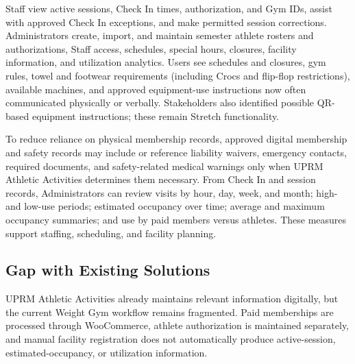 \documentclass[11pt,letterpaper]{article}
\begin{document}
Staff view active sessions, Check In times, authorization, and Gym IDs, assist with approved Check In exceptions, and make permitted session corrections. Administrators create, import, and maintain semester athlete rosters and authorizations, Staff access, schedules, special hours, closures, facility information, and utilization analytics. Users see schedules and closures, gym rules, towel and footwear requirements (including Crocs and flip-flop restrictions), available machines, and approved equipment-use instructions now often communicated physically or verbally. Stakeholders also identified possible QR-based equipment instructions; these remain Stretch functionality.

To reduce reliance on physical membership records, approved digital membership and safety records may include or reference liability waivers, emergency contacts, required documents, and safety-related medical warnings only when UPRM Athletic Activities determines them necessary. From Check In and session records, Administrators can review visits by hour, day, week, and month; high- and low-use periods; estimated occupancy over time; average and maximum occupancy summaries; and use by paid members versus athletes. These measures support staffing, scheduling, and facility planning.

\subsection{Gap with Existing Solutions}

UPRM Athletic Activities already maintains relevant information digitally, but the current Weight Gym workflow remains fragmented. Paid memberships are processed through WooCommerce, athlete authorization is maintained separately, and manual facility registration does not automatically produce active-session, estimated-occupancy, or utilization information.
\end{document}
